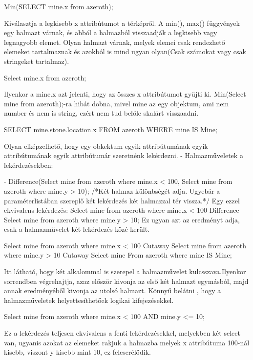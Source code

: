 \begin{sql}
\begin{sql}
Min(SELECT mine.x from azeroth);
\end{sql}
Kiválasztja a legkisebb x attribútumot a térképről.
A min(), max() függvények egy halmazt várnak, és abból a halmazból visszaadják a legkisebb vagy legnagyobb elemet. Olyan halmazt várnak, melyek elemei csak rendezhető elemeket tartalmaznak és azokból is mind ugyan olyan(Csak számokat vagy csak stringeket tartalmaz).
\begin{sql}
Select mine.x from azeroth;
\end{sql}
Ilyenkor a mine.x  azt jelenti, hogy az összes x attribútumot gyűjti ki.
Min(Select mine from azeroth);-ra hibát dobna, mivel mine az egy objektum, ami nem number és nem is string, ezért nem tud belőle skalárt visszaadni.

\begin{sql}
SELECT mine.stone.location.x FROM azeroth WHERE mine IS Mine;
\end{sql}
Olyan elképzelhető, hogy egy obkektum egyik attribútumának egyik attribútumának egyik attribútumár szeretnénk lekérdezni.
- Halmazműveletek a lekérdezésekben:

- Difference(Select mine from azeroth where mine.x < 100, Select mine from azeroth where mine.y > 10);  /*Két halmaz különbségét adja. Ugyebár a paraméterlistában szereplő két lekérdezés két halmazzal tér vissza.*/
Egy ezzel ekvivalens lekérdezés:
Select mine from azeroth where mine.x < 100 Difference Select mine from azeroth where mine.y > 10;   Ez ugyan azt az eredményt adja, csak a halmazművelet két lekérdezés közé került.

\begin{sql}
Select mine from azeroth where mine.x < 100 Cutaway Select mine from azeroth where mine.y > 10 Cutaway Select mine From azeroth where mine IS Mine;
\end{sql}
Itt látható, hogy két alkalommal is szerepel a halmazművelet kulcsszava.Ilyenkor sorrendben végrehajtja, azaz először kivonja az első két halmazt egymásból, majd annak eredményéből kivonja az utolsó halmazt.
Könnyű belátni , hogy a halmazműveletek helyettesíthetőek logikai kifejezésekkel.

\begin{sql}
Select mine from azeroth where mine.x < 100 AND mine.y <= 10;
\end{sql}
Ez a lekérdezés teljesen ekvivalens a fenti lekérdezésekkel, melyekben két select van, ugyanis azokat az elemeket rakjuk a halmazba melyek x attribútuma 100-nál kisebb, viszont y kisebb mint 10, ez felcserélődik.


\end{sql}

